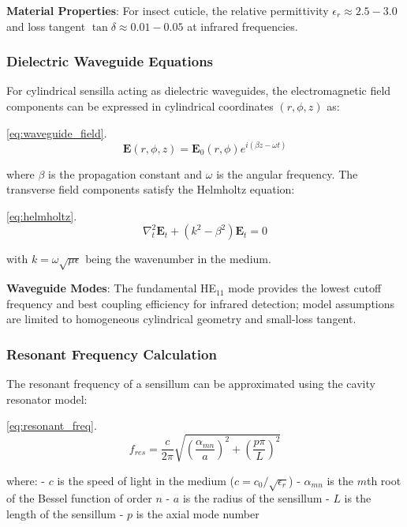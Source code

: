 \documentclass[
  13pt,
  a4paperpaper,
  12pt]{article}
\begin{document}
\textbf{Material Properties}: For insect cuticle, the relative
permittivity \(\epsilon_r \approx 2.5-3.0\) and loss tangent
\(\tan \delta \approx 0.01-0.05\) at infrared frequencies.

\subsubsection{Dielectric Waveguide
Equations}\label{dielectric-waveguide-equations}

For cylindrical sensilla acting as dielectric waveguides, the
electromagnetic field components can be expressed in cylindrical
coordinates \((r, \phi, z)\) as:

\eqref{eq:waveguide_field}. \begin{equation}
\mathbf{E}(r, \phi, z) = \mathbf{E}_0(r, \phi) e^{i(\beta z - \omega t)} \label{eq:waveguide_field}
\end{equation}

where \(\beta\) is the propagation constant and \(\omega\) is the
angular frequency. The transverse field components satisfy the Helmholtz
equation:

\eqref{eq:helmholtz}. \begin{equation}
\nabla_t^2 \mathbf{E}_t + (k^2 - \beta^2)\mathbf{E}_t = 0 \label{eq:helmholtz}
\end{equation}

with \(k = \omega \sqrt{\mu \epsilon}\) being the wavenumber in the
medium.

\textbf{Waveguide Modes}: The fundamental HE\(_{11}\) mode provides the
lowest cutoff frequency and best coupling efficiency for infrared
detection; model assumptions are limited to homogeneous cylindrical
geometry and small-loss tangent.

\subsubsection{Resonant Frequency
Calculation}\label{resonant-frequency-calculation}

The resonant frequency of a sensillum can be approximated using the
cavity resonator model:

\eqref{eq:resonant_freq}. \begin{equation}
f_{res} = \frac{c}{2\pi} \sqrt{\left(\frac{\alpha_{mn}}{a}\right)^2 + \left(\frac{p\pi}{L}\right)^2} \label{eq:resonant_freq}
\end{equation}

where: - \(c\) is the speed of light in the medium
(\(c = c_0/\sqrt{\epsilon_r}\)) - \(\alpha_{mn}\) is the \(m\)th root of
the Bessel function of order \(n\) - \(a\) is the radius of the
sensillum - \(L\) is the length of the sensillum - \(p\) is the axial
mode number
\end{document}
